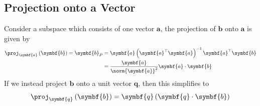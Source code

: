 \documentclass{article}
\begin{document}
\subsection{Projection onto a Vector}
Consider a subspace which consists of one vector \(\symbf{a}\), the
projection of \(\symbf{b}\) onto \(\symbf{a}\) is given by
\begin{align*}
    \proj_{\symbf{a}} \left( \symbf{b} \right) = \symbf{b}_P & = \symbf{a} \left( \symbf{a}^\top \symbf{a} \right)^{-1} \symbf{a}^\top \symbf{b} \\
                                                             & = \frac{\symbf{a}}{\norm{\symbf{a}}^2} \symbf{a} \cdot \symbf{b}
\end{align*}
If we instead project \(\symbf{b}\) onto a unit vector \(\symbf{q}\), then this simplifies to
\begin{equation*}
    \proj_{\symbf{q}} \left( \symbf{b} \right) = \symbf{q} \left( \symbf{q} \cdot \symbf{b} \right)
\end{equation*}
\end{document}
